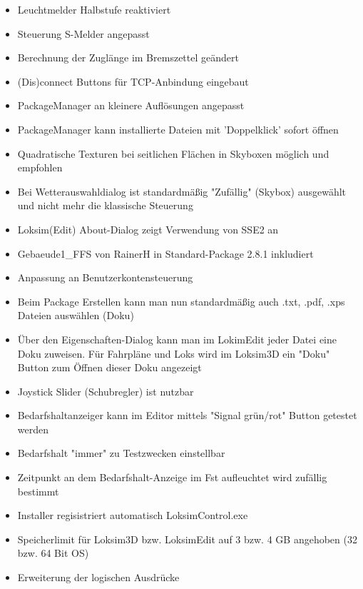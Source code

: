 \begin{itemize}
\itemsep1pt\parskip0pt
\item
  Leuchtmelder Halbstufe reaktiviert
\item
  Steuerung S-Melder angepasst
\item
  Berechnung der Zuglänge im Bremszettel geändert
\item
  (Dis)connect Buttons für TCP-Anbindung eingebaut
\item
  PackageManager an kleinere Auflösungen angepasst
\item
  PackageManager kann installierte Dateien mit 'Doppelklick' sofort
  öffnen
\item
  Quadratische Texturen bei seitlichen Flächen in Skyboxen möglich und
  empfohlen
\item
  Bei Wetterauswahldialog ist standardmäßig "Zufällig" (Skybox)
  ausgewählt und nicht mehr die klassische Steuerung
\item
  Loksim(Edit) About-Dialog zeigt Verwendung von SSE2 an
\item
  Gebaeude1\_FFS von RainerH in Standard-Package 2.8.1 inkludiert
\item
  Anpassung an Benutzerkontensteuerung
\item
  Beim Package Erstellen kann man nun standardmäßig auch .txt, .pdf,
  .xps Dateien auswählen (Doku)
\item
  Über den Eigenschaften-Dialog kann man im LokimEdit jeder Datei eine
  Doku zuweisen. Für Fahrpläne und Loks wird im Loksim3D ein "Doku"
  Button zum Öffnen dieser Doku angezeigt
\item
  Joystick Slider (Schubregler) ist nutzbar
\item
  Bedarfshaltanzeiger kann im Editor mittels "Signal grün/rot" Button
  getestet werden
\item
  Bedarfshalt "immer" zu Testzwecken einstellbar
\item
  Zeitpunkt an dem Bedarfshalt-Anzeige im Fst aufleuchtet wird zufällig
  bestimmt
\item
  Installer regisistriert automatisch LoksimControl.exe
\item
  Speicherlimit für Loksim3D bzw. LoksimEdit auf 3 bzw. 4 GB angehoben
  (32 bzw. 64 Bit OS)
\item
  Erweiterung der logischen Ausdrücke


\end{itemize}
